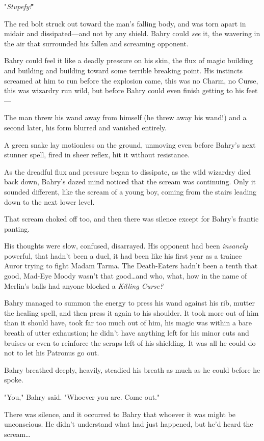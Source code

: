 "\emph{Stupefy!}"

The red bolt struck out toward the man's falling body, and was torn apart in
midair and dissipated---and not by any shield. Bahry could \emph{see} it, the
wavering in the air that surrounded his fallen and screaming opponent.

Bahry could feel it like a deadly pressure on his skin, the flux of magic
building and building and building toward some terrible breaking point. His
instincts screamed at him to run before the explosion came, this was no Charm,
no Curse, this was wizardry run wild, but before Bahry could even finish
getting to his feet---

The man threw his wand away from himself (he threw away his wand!) and a second
later, his form blurred and vanished entirely.

A green snake lay motionless on the ground, unmoving even before Bahry's next
stunner spell, fired in sheer reflex, hit it without resistance.

As the dreadful flux and pressure began to dissipate, as the wild wizardry died
back down, Bahry's dazed mind noticed that the scream was continuing. Only it
sounded different, like the scream of a young boy, coming from the stairs
leading down to the next lower level.

That scream choked off too, and then there was silence except for Bahry's
frantic panting.

His thoughts were slow, confused, disarrayed. His opponent had been
\emph{insanely} powerful, that hadn't been a duel, it had been like his first
year as a trainee Auror trying to fight Madam Tarma. The Death-Eaters hadn't
been a tenth that good, Mad-Eye Moody wasn't that good…and who, what,
how in the name of Merlin's balls had anyone blocked a \emph{Killing Curse?}

Bahry managed to summon the energy to press his wand against his rib, mutter
the healing spell, and then press it again to his shoulder. It took more out of
him than it should have, took far too much out of him, his magic was within a
bare breath of utter exhaustion; he didn't have anything left for his minor
cuts and bruises or even to reinforce the scraps left of his shielding. It was
all he could do not to let his Patronus go out.

Bahry breathed deeply, heavily, steadied his breath as much as he could before
he spoke.

"You," Bahry said. "Whoever you are. Come out."

There was silence, and it occurred to Bahry that whoever it was might be
unconscious. He didn't understand what had just happened, but he'd heard the
scream…

